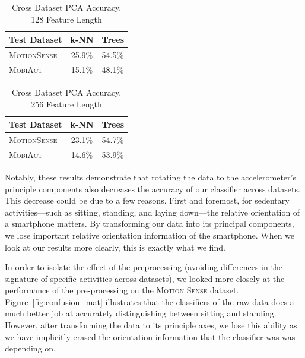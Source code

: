 \begin{table}[H]
\centering
\caption{Cross Dataset PCA Accuracy, 128 Feature Length}
\begin{tabular}{lcl}
\toprule
\multicolumn{1}{l}{\textbf{Test Dataset}} & \multicolumn{1}{c}{\textbf{k-NN}} & \multicolumn{1}{c}{\textbf{Trees}}  \\ \midrule
\textsc{MotionSense} & 25.9\%  & 54.5\% \\
\textsc{MobiAct}     & 15.1\% & 48.1\% \\
\bottomrule
\end{tabular}
\label{tab:128_pca}
\end{table}

\begin{table}[H]
\centering
\caption{Cross Dataset PCA Accuracy, 256 Feature Length}
\begin{tabular}{lcl}
\toprule
\multicolumn{1}{l}{\textbf{Test Dataset}} & \multicolumn{1}{c}{\textbf{k-NN}} & \multicolumn{1}{c}{\textbf{Trees}}  \\ \midrule
\textsc{MotionSense} & 23.1\% & 54.7\% \\
\textsc{MobiAct}     & 14.6\% & 53.9\% \\
\bottomrule
\end{tabular}
\label{tab:256_pca}
\end{table}

Notably, these results demonstrate that rotating the data to the accelerometer's principle components also decreases the accuracy of our classifier across datasets. This decrease could be due to a few reasons. First and foremost, for sedentary activities---such as sitting, standing, and laying down---the relative orientation of a smartphone matters. By transforming our data into its principal components, we lose important relative orientation information of the smartphone. When we look at our results more clearly, this is exactly what we find.

In order to isolate the effect of the preprocessing (avoiding differences in the signature of specific activities across datasets), we looked more closely at the performance of the pre-processing on the \textsc{Motion Sense} dataset. Figure~\ref{fig:confusion_mat} illustrates that the classifiers of the raw data does a much better job at accurately distinguishing between sitting and standing. However, after transforming the data to its principle axes, we lose this ability as we have implicitly erased the orientation information that the classifier was was depending on.


